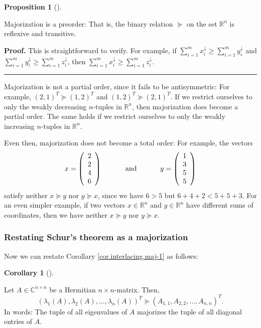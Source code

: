 \documentclass[numbers=enddot,12pt,final,onecolumn,notitlepage]{scrartcl}%
\numberwithin{exer}{subsection}
\theoremstyle{definition}
\newtheorem{prop}[theo]{Proposition}
\newenvironment{proposition}[1][]
{\begin{prop}[#1]\begin{leftbar}}
{\end{leftbar}\end{prop}}
\newtheorem{coro}[theo]{Corollary}
\newenvironment{corollary}[1][]
{\begin{coro}[#1]\begin{leftbar}}
{\end{leftbar}\end{coro}}
\newenvironment{proof}[1][Proof]{\noindent\textbf{#1.} }{\ \rule{0.5em}{0.5em}}
\let\sumnonlimits\sum
\renewcommand{\sum}{\sumnonlimits\limits}
\begin{document}
\begin{proposition}
Majorization is a preorder: That is, the binary relation $\succcurlyeq$ on the
set $\mathbb{R}^{n}$ is reflexive and transitive.
\end{proposition}

\begin{proof}
This is straightforward to verify. For example, if $\sum_{i=1}^{m}%
x_{i}^{\downarrow}\geq\sum_{i=1}^{m}y_{i}^{\downarrow}$ and $\sum_{i=1}%
^{m}y_{i}^{\downarrow}\geq\sum_{i=1}^{m}z_{i}^{\downarrow}$, then $\sum
_{i=1}^{m}x_{i}^{\downarrow}\geq\sum_{i=1}^{m}z_{i}^{\downarrow}$.
\end{proof}

Majorization is not a partial order, since it fails to be antisymmetric: For
example, $\left(  2,1\right)  ^{T}\succcurlyeq\left(  1,2\right)  ^{T}$ and
$\left(  1,2\right)  ^{T}\succcurlyeq\left(  2,1\right)  ^{T}$. If we restrict
ourselves to only the weakly decreasing $n$-tuples in $\mathbb{R}^{n}$, then
majorization does become a partial order. The same holds if we restrict
ourselves to only the weakly increasing $n$-tuples in $\mathbb{R}^{n}$.

Even then, majorization does not become a total order: For example, the
vectors%
\[
x=\left(
\begin{array}
[c]{c}%
2\\
2\\
4\\
6
\end{array}
\right)  \ \ \ \ \ \ \ \ \ \ \text{and}\ \ \ \ \ \ \ \ \ \ y=\left(
\begin{array}
[c]{c}%
1\\
3\\
5\\
5
\end{array}
\right)
\]
satisfy neither $x\succcurlyeq y$ nor $y\succcurlyeq x$, since we have $6>5$
but $6+4+2<5+5+3$. For an even simpler example, if two vectors $x\in
\mathbb{R}^{n}$ and $y\in\mathbb{R}^{n}$ have different sums of coordinates,
then we have neither $x\succcurlyeq y$ nor $y\succcurlyeq x$.

\subsubsection{Restating Schur's theorem as a majorization}

Now we can restate Corollary \ref{cor.interlacing.maj-1} as follows:

\begin{corollary}
[Schur's theorem]\label{cor.interlacing.maj-2}Let $A\in\mathbb{C}^{n\times n}$
be a Hermitian $n\times n$-matrix. Then,%
\[
\left(  \lambda_{1}\left(  A\right)  ,\lambda_{2}\left(  A\right)
,\ldots,\lambda_{n}\left(  A\right)  \right)  ^{T}\succcurlyeq\left(
A_{1,1},A_{2,2},\ldots,A_{n,n}\right)  ^{T}.
\]
In words: The tuple of all eigenvalues of $A$ majorizes the tuple of all
diagonal entries of $A$.
\end{corollary}
\end{document}
